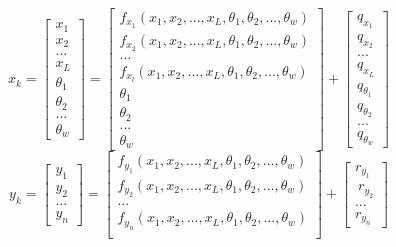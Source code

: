     \begin{equation}
    x_k = 
    \begin{bmatrix}
    x_1\\
    x_2\\
    ...\\
    x_L\\
    \theta_1\\
    \theta_2\\
    ...\\
    \theta_w
    \end{bmatrix} = 
    \begin{bmatrix}
    f_{x_1}(x_1, x_2, ..., x_L, \theta_1, \theta_2, ..., \theta_w)\\
    f_{x_2}(x_1, x_2, ..., x_L, \theta_1, \theta_2, ..., \theta_w)\\
    ...\\
    f_{x_l}(x_1, x_2, ..., x_L, \theta_1, \theta_2, ..., \theta_w)\\
    \theta_1\\
    \theta_2\\
    ...\\
    \theta_w
    \end{bmatrix} +
    \begin{bmatrix}
    q_{x_1}\\
    q_{x_2}\\
    ...\\
    q_{x_L}\\
    q_{\theta_1}\\
    q_{\theta_2}\\
    ...\\
    q_{\theta_w}
    \end{bmatrix}
    \end{equation}
    \begin{equation}
    y_k = 
    \begin{bmatrix}
    y_1\\
    y_2\\
    ...\\
    y_n
    \end{bmatrix} = 
    \begin{bmatrix}
    f_{y_1}(x_1, x_2, ..., x_L, \theta_1, \theta_2, ..., \theta_w)\\
    f_{y_2}(x_1, x_2, ..., x_L, \theta_1, \theta_2, ..., \theta_w)\\
    ...\\
    f_{y_n}(x_1, x_2, ..., x_L, \theta_1, \theta_2, ..., \theta_w)\\
    \end{bmatrix} +
    \begin{bmatrix}
    r_{y_1}\\\
    r_{y_2}\\
    ...\\
    r_{y_n}
    \end{bmatrix}
    \end{equation}
